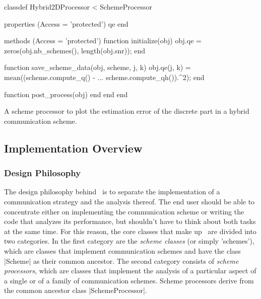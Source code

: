 \begin{listing}
\begin{Code}
  classdef Hybrid2DProcessor < SchemeProcessor
      
      properties (Access = 'protected')
          qe
      end
      
      methods (Access = 'protected')
          function initialize(obj)
              obj.qe = zeros(obj.nb_schemes(), length(obj.snr));
          end
          
          function save_scheme_data(obj, scheme, j, k)
              obj.qe(j, k) = mean((scheme.compute_q() - ...
                scheme.compute_qh()).^2);
          end
          
          function post_process(obj)
          end
      end
  end
\end{Code}
\caption{A scheme processor to plot the estimation error of the discrete part in
a hybrid communication scheme.}
\label{lst:hybridprocessor}
\end{listing}


\subsection{Implementation Overview}\label{sec:impoverview}

\subsubsection{Design Philosophy}

The design philosophy behind \jscsim\ is to separate the implementation of a
communication strategy and the analysis thereof. The end user should be able to
concentrate either on implementing the communication scheme or writing the code
that analyzes its performance, but shouldn't have to think about both tasks at
the same time.  For this reason, the core classes that make up \jscsim\ are
divided into two categories. In the first category are the \emph{scheme classes}
(or simply 'schemes'), which are classes that implement communication
schemes and have the class |Scheme| as their common ancestor. The second
category consists of  \emph{scheme processors}, which are classes that implement
the analysis of a particular aspect of a single or of a family of communication
schemes. Scheme processors derive from the common ancestor class
|SchemeProcessor|. 

